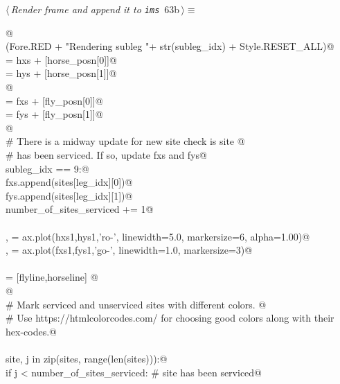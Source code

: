 \documentclass[11.5pt]{report}
\begin{document}
\begin{flushleft} \small\label{scrap96}\raggedright\small
{} $\langle\,${\itshape Render frame and append it to \verb|ims|}\nobreak\ {\footnotesize {63b}}$\,\rangle\equiv$
\vspace{-1ex}
\begin{list}{}{} \item
\mbox{}\verb@   @\\
\mbox{}\verb@debug(Fore.RED + "Rendering subleg "+ str(subleg_idx) + Style.RESET_ALL)@\\
\mbox{} = hxs + [horse_posn[0]]@\\
\mbox{} = hys + [horse_posn[1]]@\\
\mbox{}\verb@               @\\
\mbox{} = fxs + [fly_posn[0]]@\\
\mbox{} = fys + [fly_posn[1]]@\\
\mbox{}\verb@                 @\\
\mbox{}\verb@# There is a midway update for new site check is site @\\
\mbox{}\verb@# has been serviced. If so, update fxs and fys@\\
\mbox{}\verb@if subleg_idx == 9:@\\
\mbox{}\verb@    fxs.append(sites[leg_idx][0])@\\
\mbox{}\verb@    fys.append(sites[leg_idx][1])@\\
\mbox{}\verb@    number_of_sites_serviced += 1@\\
\mbox{}\verb@@\\
\mbox{}\verb@horseline, = ax.plot(hxs1,hys1,'ro-', linewidth=5.0, markersize=6, alpha=1.00)@\\
\mbox{}\verb@flyline,   = ax.plot(fxs1,fys1,'go-', linewidth=1.0, markersize=3)@\\
\mbox{}\verb@@\\
\mbox{}\verb@objs = [flyline,horseline] @\\
\mbox{}\verb@ @\\
\mbox{}\verb@# Mark serviced and unserviced sites with different colors. @\\
\mbox{}\verb@# Use https://htmlcolorcodes.com/ for choosing good colors along with their hex-codes.@\\
\mbox{}\verb@@\\
\mbox{}\verb@for site, j in zip(sites, range(len(sites))):@\\
\mbox{}\verb@    if j < number_of_sites_serviced:       # site has been serviced@\\

\end{list}
\end{flushleft}
\end{document}
